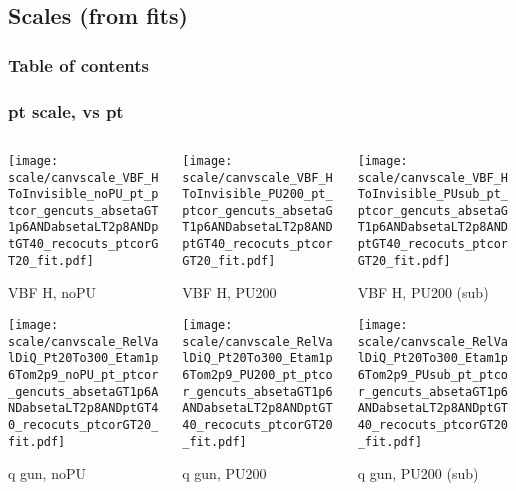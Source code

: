 \documentclass[8pt]{beamer}
\begin{document}
 \subsection{Scales (from fits)}

\begin{frame}
 \frametitle{Table of contents}
 
\end{frame}

 \begin{frame}
  \frametitle{pt scale, vs pt}
  
  \begin{columns}
   \begin{column}{0.35\textwidth}
     \texttt{[image: scale/canvscale\_VBF\_HToInvisible\_noPU\_pt\_ptcor\_gencuts\_absetaGT1p6ANDabsetaLT2p8ANDptGT40\_recocuts\_ptcorGT20\_fit.pdf]}
     
     VBF H, noPU
    
     \texttt{[image: scale/canvscale\_RelValDiQ\_Pt20To300\_Etam1p6Tom2p9\_noPU\_pt\_ptcor\_gencuts\_absetaGT1p6ANDabsetaLT2p8ANDptGT40\_recocuts\_ptcorGT20\_fit.pdf]}
     
     q gun, noPU
   \end{column}
   \begin{column}{0.35\textwidth}
     \texttt{[image: scale/canvscale\_VBF\_HToInvisible\_PU200\_pt\_ptcor\_gencuts\_absetaGT1p6ANDabsetaLT2p8ANDptGT40\_recocuts\_ptcorGT20\_fit.pdf]}
     
     VBF H, PU200
    
     \texttt{[image: scale/canvscale\_RelValDiQ\_Pt20To300\_Etam1p6Tom2p9\_PU200\_pt\_ptcor\_gencuts\_absetaGT1p6ANDabsetaLT2p8ANDptGT40\_recocuts\_ptcorGT20\_fit.pdf]}
     
     q gun, PU200
   \end{column}
   \begin{column}{0.35\textwidth}
     \texttt{[image: scale/canvscale\_VBF\_HToInvisible\_PUsub\_pt\_ptcor\_gencuts\_absetaGT1p6ANDabsetaLT2p8ANDptGT40\_recocuts\_ptcorGT20\_fit.pdf]}
     
     VBF H, PU200 (sub)
    
     \texttt{[image: scale/canvscale\_RelValDiQ\_Pt20To300\_Etam1p6Tom2p9\_PUsub\_pt\_ptcor\_gencuts\_absetaGT1p6ANDabsetaLT2p8ANDptGT40\_recocuts\_ptcorGT20\_fit.pdf]}
     
     q gun, PU200 (sub)
   \end{column}
  \end{columns}
 \end{frame}
 
\end{document}
